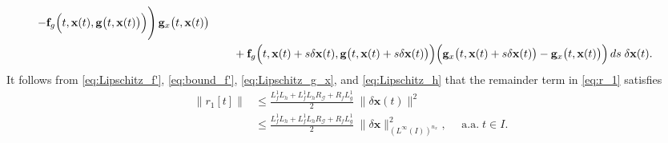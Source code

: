 \documentclass[onefignum,onetabnum]{siamart220329}
\numberwithin{equation}{section}
\newcommand{\aall}{\mbox{ a.a.} \;}
\newcommand{\bff}{\ensuremath{\mathbf{f}}} %
\newcommand{\bg}{\ensuremath{\mathbf{g}}} %
\newcommand{\bx}{\ensuremath{\mathbf{x}}} %
\newcommand {\cG} {\mathcal{G}}
\begin{document}
\begin{appendix}
\begin{align}
                     -  \bff_g\Big( t, \bx(t), \bg\big(t, \bx(t) \big) \Big) \Bigg) \, \bg_x\big(t, \bx(t) \big)   \nonumber  \\
        &\hspace*{5ex}      + \bff_g\Big( t, \bx(t) + s \delta \bx(t), \bg\big(t, \bx(t) + s \delta \bx(t) \big) \Big)  
                    \Big( \bg_x\big(t, \bx(t) + s \delta \bx(t) \big) - \bg_x\big(t, \bx(t) \big) \Big) \, ds \; \delta \bx(t). \label{eq:r_1}
    \end{align}
    It follows from \cref{eq:Lipschitz_f'}, \cref{eq:bound_f'}, \cref{eq:Lipschitz_g_x}, and \cref{eq:Lipschitz_h} that  the remainder term in \cref{eq:r_1} satisfies
    \begin{align}  \label{eq:r_1_bound}
       \big\|  r_1[t]  \big\| 
        &\le \frac{  L_f^1 L_h + L_f^1 L_h R_\cG + R_f L_g^1  }{2} \; \| \delta \bx(t) \|^2      \nonumber \\
        &\leq \frac{  L_f^1 L_h + L_f^1 L_h R_\cG + R_f L_g^1  }{2} \; \| \delta \bx \|_{(L^\infty(I))^{n_x}}^2, \quad \aall t \in I.
    \end{align}
    

\end{appendix}
\end{document}
